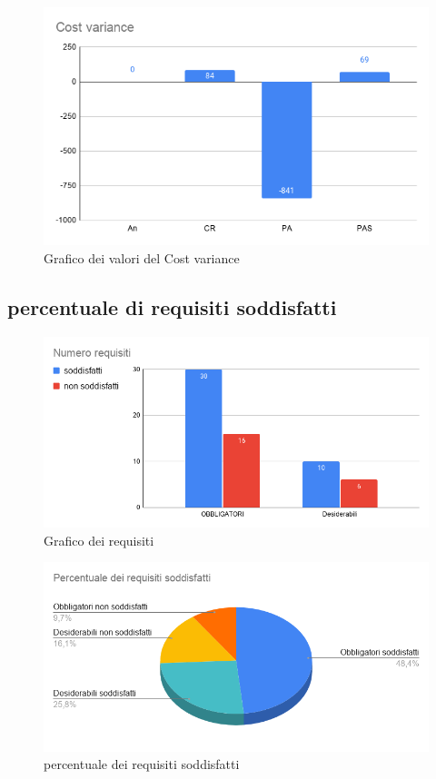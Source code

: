     \begin{figure}[H]
        \centering
        \includegraphics[width=10 cm]{source/sections/images/cost_variance.png}
        \caption{Grafico dei valori del Cost variance}
    \end{figure}

\newpage
\subsection{percentuale di requisiti soddisfatti}

\begin{figure}[H]
    \centering
    \includegraphics[width=10 cm]{source/sections/images/num-requisiti.png}
    \caption{Grafico dei requisiti}
\end{figure}

\begin{figure}[H]
    \centering
    \includegraphics[width=10 cm]{source/sections/images/percentuale-requisiti.png}
    \caption{percentuale dei requisiti soddisfatti}
\end{figure}


